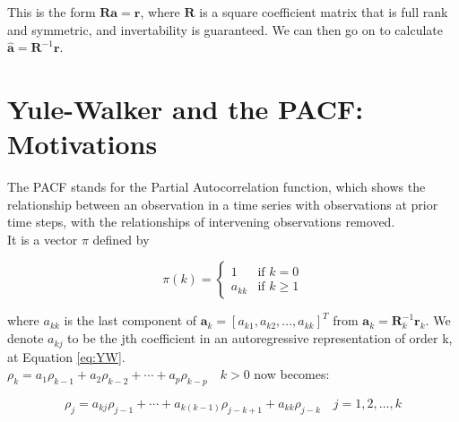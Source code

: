This is the form $\mathbf{Ra} = \mathbf{r}$, where $\mathbf{R}$ is a square coefficient matrix that is full rank and symmetric, and invertability is guaranteed. We can then go on to calculate $\hat{\mathbf{a}}=\mathbf{R}^{-1}\mathbf{r}$.

\section{Yule-Walker and the PACF: Motivations}
The PACF stands for the Partial Autocorrelation function, which shows the relationship between an observation in a time series with observations at prior time steps, with the relationships of intervening observations removed. \\

It is a vector $\pi$ defined by

\begin{equation}
    \pi(k) = 
\begin{cases} 
1 & \text{if } k=0 \\
a_{kk} & \text{if } k\geq1
\end{cases}
\end{equation}

where $a_{kk}$ is the last component of $\mathbf{a}_k=[a_{k1},a_{k2},\ldots,a_{kk}]^T$ from $\mathbf{a}_k=\mathbf{R}_k^{-1}\mathbf{r}_k$. We denote $a_{kj}$ to be the jth coefficient in an autoregressive representation of order k, at Equation \ref{eq:YW}.\\

$\rho_k=a_1\rho_{k-1}+a_2\rho_{k-2}+\cdots+a_p\rho_{k-p}\quad k>0$ now becomes:

\begin{equation}
    \rho_j=a_{kj}\rho_{j-1}+\cdots+a_{k(k-1)}\rho_{j-k+1}+a_{kk}\rho_{j-k}\quad j=1,2,\ldots,k
\end{equation}

